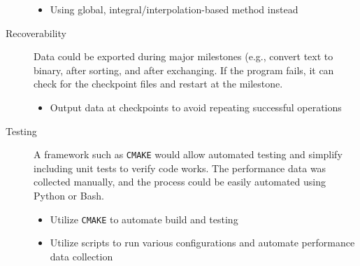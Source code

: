 \documentclass{article}
\begin{document}
\begin{description}
\begin{itemize}
            \item Using global, integral/interpolation-based method instead
        \end{itemize}
    \item [Recoverability]{Data could be exported during major milestones (e.g., convert text to binary, after sorting, and after exchanging. If the program fails, it can check for the checkpoint files and restart at the milestone.}
        \begin{itemize}
            \item Output data at checkpoints to avoid repeating successful operations
        \end{itemize}
     \item [Testing]{A framework such as \texttt{CMAKE} would allow automated testing and simplify including unit tests to verify code works. The performance data was collected manually, and the process could be easily automated using Python or Bash.}
     	\begin{itemize}
	\item Utilize \texttt{CMAKE} to automate build and testing
	\item Utilize scripts to run various configurations and automate performance data collection
	\end{itemize}
\end{description}


\end{document}

